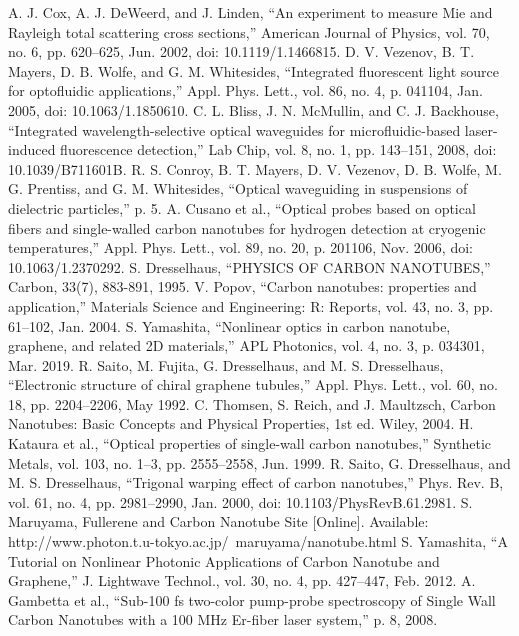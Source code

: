 \begin{thebibliography}{99}
A. J. Cox, A. J. DeWeerd, and J. Linden, “An experiment to measure Mie and Rayleigh total scattering cross sections,” American Journal of Physics, vol. 70, no. 6, pp. 620–625, Jun. 2002, doi: 10.1119/1.1466815.
D. V. Vezenov, B. T. Mayers, D. B. Wolfe, and G. M. Whitesides, “Integrated fluorescent light source for optofluidic applications,” Appl. Phys. Lett., vol. 86, no. 4, p. 041104, Jan. 2005, doi: 10.1063/1.1850610.
C. L. Bliss, J. N. McMullin, and C. J. Backhouse, “Integrated wavelength-selective optical waveguides for microfluidic-based laser-induced fluorescence detection,” Lab Chip, vol. 8, no. 1, pp. 143–151, 2008, doi: 10.1039/B711601B.
R. S. Conroy, B. T. Mayers, D. V. Vezenov, D. B. Wolfe, M. G. Prentiss, and G. M. Whitesides, “Optical waveguiding in suspensions of dielectric particles,” p. 5.
A. Cusano et al., “Optical probes based on optical fibers and single-walled carbon nanotubes for hydrogen detection at cryogenic temperatures,” Appl. Phys. Lett., vol. 89, no. 20, p. 201106, Nov. 2006, doi: 10.1063/1.2370292.
 S. Dresselhaus, “PHYSICS OF CARBON NANOTUBES,” Carbon, 33(7), 883-891, 1995.
 V. Popov, “Carbon nanotubes: properties and application,” Materials Science and Engineering: R: Reports, vol. 43, no. 3, pp. 61–102, Jan. 2004.
 S. Yamashita, “Nonlinear optics in carbon nanotube, graphene, and related 2D materials,” APL Photonics, vol. 4, no. 3, p. 034301, Mar. 2019.
R. Saito, M. Fujita, G. Dresselhaus, and M. S. Dresselhaus, “Electronic structure of chiral graphene tubules,” Appl. Phys. Lett., vol. 60, no. 18, pp. 2204–2206, May 1992.
C. Thomsen, S. Reich, and J. Maultzsch, Carbon Nanotubes: Basic Concepts and Physical Properties, 1st ed. Wiley, 2004. 
 H. Kataura et al., “Optical properties of single-wall carbon nanotubes,” Synthetic Metals, vol. 103, no. 1–3, pp. 2555–2558, Jun. 1999.
 R. Saito, G. Dresselhaus, and M. S. Dresselhaus, “Trigonal warping effect of carbon nanotubes,” Phys. Rev. B, vol. 61, no. 4, pp. 2981–2990, Jan. 2000, doi: 10.1103/PhysRevB.61.2981.
 S. Maruyama, Fullerene and Carbon Nanotube Site [Online]. Available: http://www.photon.t.u-tokyo.ac.jp/~maruyama/nanotube.html
 S. Yamashita, “A Tutorial on Nonlinear Photonic Applications of Carbon Nanotube and Graphene,” J. Lightwave Technol., vol. 30, no. 4, pp. 427–447, Feb. 2012.
A. Gambetta et al., “Sub-100 fs two-color pump-probe spectroscopy of Single Wall Carbon Nanotubes with a 100 MHz Er-fiber laser system,” p. 8, 2008.

\end{thebibliography}
